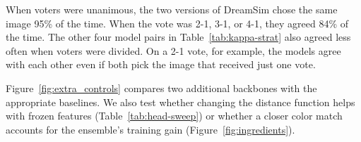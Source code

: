 When voters were unanimous, the two versions of DreamSim chose the same image 95\% of the time. When the vote was 2-1, 3-1, or 4-1, they agreed 84\% of the time. The other four model pairs in Table~\ref{tab:kappa-strat} also agreed less often when voters were divided. On a 2-1 vote, for example, the models agree with each other even if both pick the image that received just one vote.

\begin{table}[!ht]
\caption{Agreement between model pairs (Cohen's $\kappa$), grouped by how people voted. The last column also includes three triplets on which two voters chose the less popular image.}
\label{tab:kappa-strat}
\centering
\small
{}
\end{table}

\clearpage
{}
\vspace{1em}

Figure~\ref{fig:extra_controls} compares two additional backbones with the appropriate baselines. We also test whether changing the distance function helps with frozen features (Table~\ref{tab:head-sweep}) or whether a closer color match accounts for the ensemble's training gain (Figure~\ref{fig:ingredients}).

